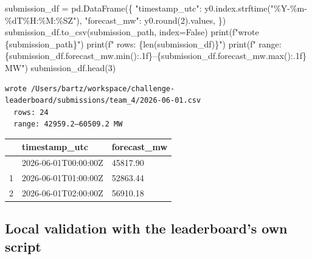 \documentclass[
  english,
  letterpaper,
]{scrbook}
\newenvironment{Shaded}{\begin{snugshade}}{\end{snugshade}}
\newcommand{\BuiltInTok}[1]{\textcolor[rgb]{0.00,0.23,0.31}{#1}}
\newcommand{\DecValTok}[1]{\textcolor[rgb]{0.68,0.00,0.00}{#1}}
\newcommand{\NormalTok}[1]{\textcolor[rgb]{0.00,0.23,0.31}{#1}}
\newcommand{\OperatorTok}[1]{\textcolor[rgb]{0.37,0.37,0.37}{#1}}
\newcommand{\SpecialCharTok}[1]{\textcolor[rgb]{0.37,0.37,0.37}{#1}}
\newcommand{\SpecialStringTok}[1]{\textcolor[rgb]{0.13,0.47,0.30}{#1}}
\newcommand{\StringTok}[1]{\textcolor[rgb]{0.13,0.47,0.30}{#1}}
\newcommand{\VariableTok}[1]{\textcolor[rgb]{0.07,0.07,0.07}{#1}}
\newcounter{none} %
\begin{document}
\begin{Shaded}
\begin{Highlighting}[]
\NormalTok{submission\_df }\OperatorTok{=}\NormalTok{ pd.DataFrame(\{}
    \StringTok{"timestamp\_utc"}\NormalTok{: y0.index.strftime(}\StringTok{"\%Y{-}\%m{-}}\SpecialCharTok{\%d}\StringTok{T\%H:\%M:\%SZ"}\NormalTok{),}
    \StringTok{"forecast\_mw"}\NormalTok{:   y0.}\BuiltInTok{round}\NormalTok{(}\DecValTok{2}\NormalTok{).values,}
\NormalTok{\})}
\NormalTok{submission\_df.to\_csv(submission\_path, index}\OperatorTok{=}\VariableTok{False}\NormalTok{)}
\BuiltInTok{print}\NormalTok{(}\SpecialStringTok{f"wrote }\SpecialCharTok{\{}\NormalTok{submission\_path}\SpecialCharTok{\}}\SpecialStringTok{"}\NormalTok{)}
\BuiltInTok{print}\NormalTok{(}\SpecialStringTok{f"  rows: }\SpecialCharTok{\{}\BuiltInTok{len}\NormalTok{(submission\_df)}\SpecialCharTok{\}}\SpecialStringTok{"}\NormalTok{)}
\BuiltInTok{print}\NormalTok{(}\SpecialStringTok{f"  range: }\SpecialCharTok{\{}\NormalTok{submission\_df}\SpecialCharTok{.}\NormalTok{forecast\_mw}\SpecialCharTok{.}\BuiltInTok{min}\NormalTok{()}\SpecialCharTok{:.1f\}}\SpecialStringTok{–}\SpecialCharTok{\{}\NormalTok{submission\_df}\SpecialCharTok{.}\NormalTok{forecast\_mw}\SpecialCharTok{.}\BuiltInTok{max}\NormalTok{()}\SpecialCharTok{:.1f\}}\SpecialStringTok{ MW"}\NormalTok{)}
\NormalTok{submission\_df.head(}\DecValTok{3}\NormalTok{)}
\end{Highlighting}
\end{Shaded}

\begin{verbatim}
wrote /Users/bartz/workspace/challenge-leaderboard/submissions/team_4/2026-06-01.csv
  rows: 24
  range: 42959.2–60509.2 MW
\end{verbatim}

\protect{}\label{team4-submission-write}
{\def\LTcaptype{none} %
\begin{longtable}[]{@{}lll@{}}
\toprule\noalign{}
& timestamp\_utc & forecast\_mw \\
\midrule\noalign{}
\endhead
\bottomrule\noalign{}
\endlastfoot
0 & 2026-06-01T00:00:00Z & 45817.90 \\
1 & 2026-06-01T01:00:00Z & 52863.44 \\
2 & 2026-06-01T02:00:00Z & 56910.18 \\
\end{longtable}
}

\subsection{Local validation with the leaderboard's own
script}\label{local-validation-with-the-leaderboards-own-script-1}
\end{document}
